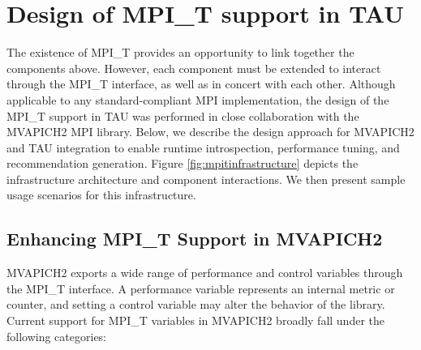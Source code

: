 \chapter{Design of MPI\_T support in TAU}
The existence of MPI\_T provides an opportunity to link together the components above. However, each component must be extended to interact through the MPI\_T interface, as well as in concert with each other. Although applicable to any standard-compliant MPI implementation, the design of the MPI\_T support in TAU was performed in close collaboration with the MVAPICH2 MPI library. Below, we describe the design approach for MVAPICH2 and TAU integration to enable runtime introspection, performance tuning, and recommendation generation. Figure \ref{fig:mpitinfrastructure} depicts the infrastructure architecture and component interactions. We then present sample usage scenarios for this infrastructure. 
\section {Enhancing MPI\_T Support in MVAPICH2}
MVAPICH2 exports a wide range of performance and control variables through the MPI\_T interface. A performance variable represents an internal metric or counter, and setting a control variable may alter the behavior of the library. Current support for MPI\_T variables in MVAPICH2 broadly fall under the following categories:

